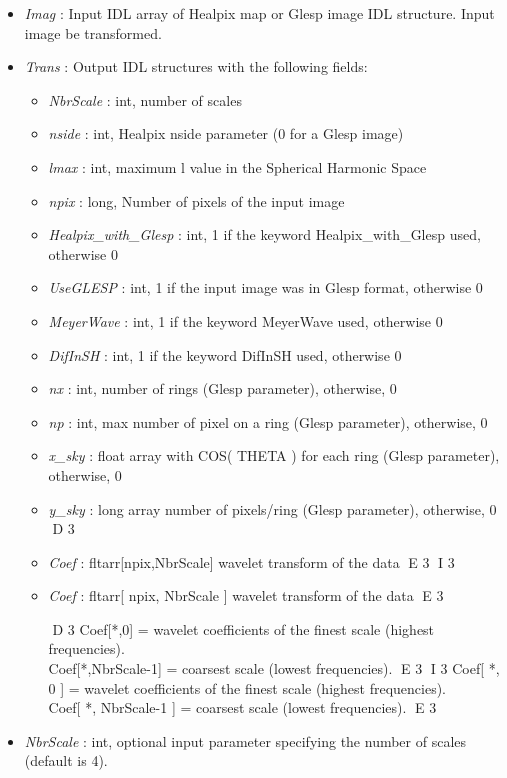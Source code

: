 \begin{itemize}
\item {\em Imag} : Input IDL array of Healpix map or Glesp image IDL structure. Input image be transformed. 
\item {\em Trans} : Output IDL structures with the following fields:
\begin{itemize}
\item {\em NbrScale} : int, number of scales
\item {\em nside} : int, Healpix nside parameter (0 for a Glesp image)
\item {\em lmax} : int, maximum l value in the Spherical Harmonic Space
\item {\em npix} : long, Number of pixels of the input image
\item {\em Healpix\_with\_Glesp} : int, 1 if the keyword Healpix\_with\_Glesp used, otherwise 0
\item {\em UseGLESP} : int, 1 if the input image was in Glesp format, otherwise 0
\item {\em MeyerWave} : int, 1 if the keyword MeyerWave used, otherwise 0
\item {\em DifInSH} : int, 1 if the keyword DifInSH used, otherwise 0
\item {\em nx} : int, number of rings (Glesp parameter), otherwise, 0
\item {\em np} : int, max number of pixel on a ring (Glesp parameter), otherwise, 0
\item {\em x\_sky} : float array with COS( THETA ) for each ring (Glesp parameter), otherwise, 0
\item {\em y\_sky} : long array number of pixels/ring (Glesp parameter), otherwise, 0
D 3
\item {\em Coef} : fltarr[npix,NbrScale] wavelet transform of the data
E 3
I 3
\item {\em Coef} : fltarr[ npix, NbrScale ] wavelet transform of the data
E 3
\begin{center}
D 3
Coef[*,0] = wavelet coefficients of the finest scale (highest frequencies).\\
Coef[*,NbrScale-1] = coarsest scale (lowest frequencies). 
E 3
I 3
Coef[ *, 0 ] = wavelet coefficients of the finest scale (highest frequencies).\\
Coef[ *, NbrScale-1 ] = coarsest scale (lowest frequencies). 
E 3
\end{center}
\end{itemize}
\item {\em NbrScale} : int, optional input parameter specifying the number of scales (default is 4).

\end{itemize}
